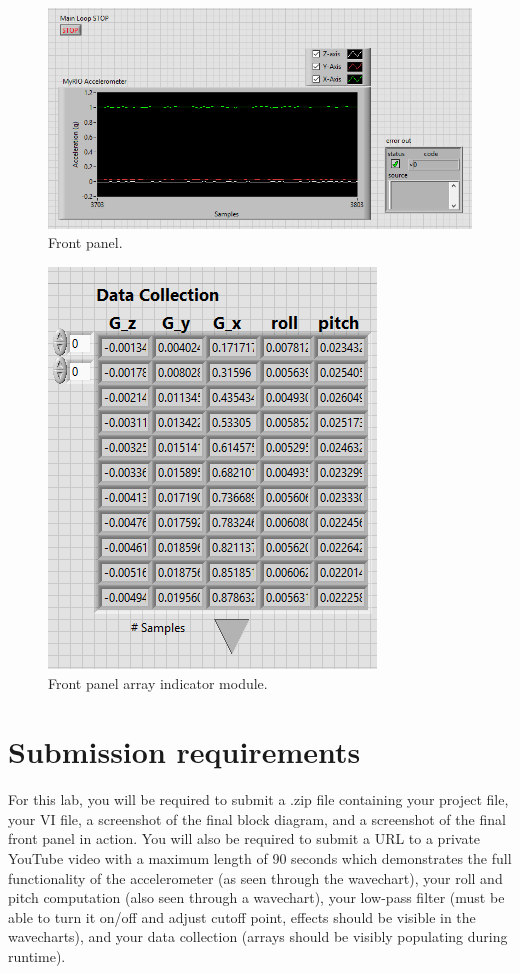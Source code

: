 \documentclass{article}
\begin{document}
\begin{figure}[h!]
\hspace{-20mm} 
\includegraphics[scale=1]{figs/_5.png}
\caption{Front panel.}
\label{fig:_5}
\end{figure}

\begin{figure}[h!]
\hspace{25mm} 
\includegraphics[scale=1]{figs/array.png}
\caption{Front panel array indicator module.}
\label{fig:array}
\end{figure}

\section{Submission requirements}

For this lab, you will be required to submit a .zip file containing your project file, your VI file, a screenshot of the final block diagram, and a screenshot of the final front panel in action. You will also be required to submit a URL to a private YouTube video with a maximum length of 90 seconds which demonstrates the full functionality of the accelerometer (as seen through the wavechart), your roll and pitch computation (also seen through a wavechart), your low-pass filter (must be able to turn it on/off and adjust cutoff point, effects should be visible in the wavecharts), and your data collection (arrays should be visibly populating during runtime).  
\end{document}
